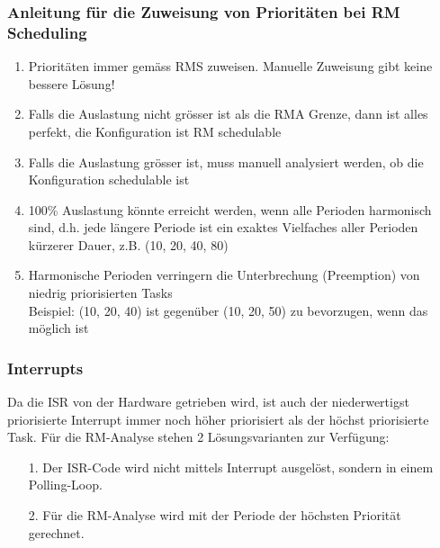\subsubsection{Anleitung für die Zuweisung von Prioritäten bei RM Scheduling}
\begin{enumerate}
  \item Prioritäten immer gemäss RMS zuweisen. Manuelle Zuweisung gibt keine bessere Lösung!
  \item Falls die Auslastung nicht grösser ist als die RMA Grenze, dann ist alles perfekt, die Konfiguration ist RM schedulable
  \item Falls die Auslastung grösser ist, muss manuell analysiert werden, ob die Konfiguration schedulable ist
  \item 100\% Auslastung könnte erreicht werden, wenn alle Perioden harmonisch sind, d.h. jede längere Periode ist ein exaktes Vielfaches aller Perioden kürzerer Dauer, z.B. (10, 20, 40, 80)
  \item Harmonische Perioden verringern die Unterbrechung (Preemption) von niedrig priorisierten Tasks\\
        Beispiel: (10, 20, 40) ist gegenüber (10, 20, 50) zu bevorzugen, wenn das möglich ist
\end{enumerate}


\subsubsection{Interrupts}
Da die ISR von der Hardware getrieben wird, ist auch der niederwertigst priorisierte Interrupt
immer noch höher priorisiert als der höchst priorisierte Task. Für die RM-Analyse stehen 2 Lösungsvarianten zur Verfügung:
\begin{itemize}
  \item[1.]  Der ISR-Code wird nicht mittels Interrupt ausgelöst, sondern in einem Polling-Loop.
  \item[2.]  Für die RM-Analyse wird mit der Periode der höchsten Priorität gerechnet.
\end{itemize}
